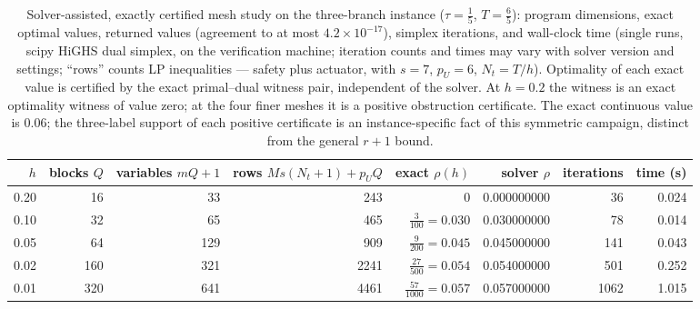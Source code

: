 \documentclass[10pt,twocolumn]{article}
\theoremstyle{plain}
\theoremstyle{definition}
\theoremstyle{remark}
\begin{document}
\begin{table}[t]
\centering
\footnotesize
\begin{tabular}{@{}r|r|r|r|r|r|r|r@{}}
\toprule
\(h\) & blocks \(Q\) & variables \(mQ{+}1\) & rows \(Ms(N_t{+}1)+p_UQ\) & exact \(\rho(h)\) & solver \(\rho\) & iterations & time (s) \\
\midrule
0.20 & 16 & 33  & 243  & \(0\) & 0.000000000 & 36   & 0.024 \\
0.10 & 32 & 65  & 465  & \(\tfrac{3}{100} = 0.030\) & 0.030000000 & 78   & 0.014 \\
0.05 & 64 & 129 & 909  & \(\tfrac{9}{200} = 0.045\) & 0.045000000 & 141  & 0.043 \\
0.02 & 160 & 321 & 2241 & \(\tfrac{27}{500} = 0.054\) & 0.054000000 & 501  & 0.252 \\
0.01 & 320 & 641 & 4461 & \(\tfrac{57}{1000} = 0.057\) & 0.057000000 & 1062 & 1.015 \\
\bottomrule
\end{tabular}
\caption{Solver-assisted, exactly certified mesh study on the three-branch
instance (\(\tau = \tfrac15\), \(T = \tfrac65\)): program dimensions,
exact optimal values, returned values (agreement to at most
\(4.2 \times 10^{-17}\)), simplex iterations, and wall-clock time (single
runs, scipy HiGHS dual simplex, on the verification machine; iteration
counts and times may vary with solver version and settings; ``rows'' counts
LP inequalities --- safety plus actuator, with \(s = 7\), \(p_U = 6\),
\(N_t = T/h\)). Optimality of each exact value is certified by the exact
primal--dual witness pair, independent of the solver. At \(h = 0.2\) the
witness is an exact optimality witness of value zero; at the four finer
meshes it is a positive obstruction certificate. The exact continuous value
is \(0.06\); the three-label support of each positive certificate is an
instance-specific fact of this symmetric campaign, distinct from the
general \(r + 1\) bound.}
\label{lp-tab:mesh}
\end{table}
\end{document}
